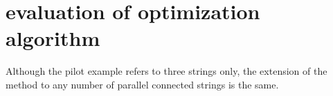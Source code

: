 \documentclass[conference]{IEEEtran}
\begin{document}
\section{evaluation of optimization algorithm}
Although the pilot example refers to three strings only, the extension of the method to any number of parallel connected strings is the same.


\end{document}
